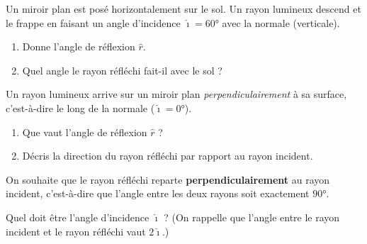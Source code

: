 \documentclass[11pt,a4paper]{article}
\begin{document}
\begin{exo}
Un miroir plan est posé horizontalement sur le sol. Un rayon lumineux descend et le frappe en faisant
un angle d'incidence $\hat{\imath}=\ang{60}$ avec la normale (verticale).
\begin{center}
\end{center}
\begin{enumerate}[label=\alph*)]
  \item Donne l'angle de réflexion $\hat{r}$.
  \item Quel angle le rayon réfléchi fait-il avec le sol ?
\end{enumerate}
\end{exo}

\begin{exo}
Un rayon lumineux arrive sur un miroir plan \emph{perpendiculairement} à sa surface, c'est-à-dire le
long de la normale ($\hat{\imath}=\ang{0}$).
\begin{enumerate}[label=\alph*)]
  \item Que vaut l'angle de réflexion $\hat{r}$ ?
  \item Décris la direction du rayon réfléchi par rapport au rayon incident.
\end{enumerate}
\end{exo}

\begin{exo}
On souhaite que le rayon réfléchi reparte \textbf{perpendiculairement} au rayon incident, c'est-à-dire
que l'angle entre les deux rayons soit exactement $\ang{90}$.

Quel doit être l'angle d'incidence $\hat{\imath}$ ? (On rappelle que l'angle entre le rayon incident et
le rayon réfléchi vaut $2\hat{\imath}$.)
\end{exo}
\end{document}
